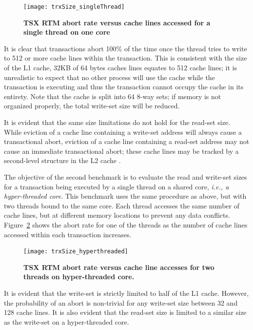 \documentclass[11pt]{book}
\begin{document}
\begin{figure}
    \centering
    \graphicspath{ {./figures/} }
    \texttt{[image: trxSize\_singleThread]}
    \caption{\textbf{TSX RTM abort rate versus cache lines accessed for a single thread on
        one core}}\label{fig:trx_size} 
\end{figure}

It is clear that transactions abort 100\% of the time once the thread tries to write to
512 or more cache lines within the transaction.  This is consistent with the size of the
L1 cache, 32KB of 64 bytes caches lines equates to 512 cache lines; it is unrealistic to
expect that no other process will use the cache while the transaction is executing and
thus the transaction cannot occupy the cache in its entirety.  Note that the cache is
split into 64 8-way sets; if memory is not organized properly, the total write-set size
will be reduced.

It is evident that the same size limitations do not hold for the read-set size.  While
eviction of a cache line containing a write-set address will always cause a transactional
abort, eviction of a cache line containing a read-set address may not cause an immediate
transactional abort; these cache lines may be tracked by a second-level structure in the
L2 cache \cite{intel_opt_man}.

The objective of the second benchmark is to evaluate the read and write-set sizes for a
transaction being executed by a single thread on a shared core, \emph{i.e., a
  hyper-threaded core}.  This benchmark uses the same procedure as above, but with two
threads bound to the same core.  Each thread accesses the same number of cache lines, but
at different memory locations to prevent any data conflicts. Figure~\ref{fig:trx_size_ht}
shows the abort rate for one of the threads as the number of cache lines accessed within
each transaction increases.

\begin{figure}
    \centering
    \graphicspath{ {./figures/} }
    \texttt{[image: trxSize\_hyperthreaded]}
    \caption{\textbf{TSX RTM abort rate versus cache line accesses for two threads on
        hyper-threaded core.}}\label{fig:trx_size_ht}
\end{figure}

It is evident that the write-set is strictly limited to half of the L1 cache.  However,
the probability of an abort is non-trivial for any write-set size between 32 and 128 cache
lines.  It is also evident that the read-set size is limited to a similar size as the
write-set on a hyper-threaded core.
\end{document}
